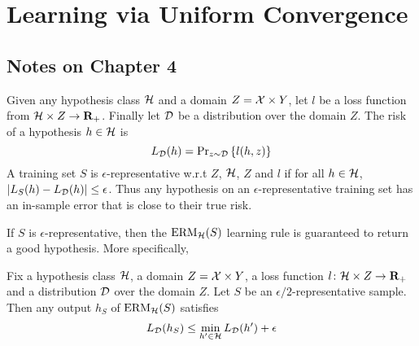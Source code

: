 \chapter{Learning via Uniform Convergence}

\section*{Notes on Chapter 4}

Given any hypothesis class $\mathcal{H}$ and a domain $Z = \mathcal{X} \times Y$, let
$l$ be a loss function from $\mathcal{H} \times Z \rightarrow \mathbf{R}_{+}$. Finally let
$\mathcal{D}$ be a distribution over the domain $Z$. The risk of a hypothesis $h \in
\mathcal{H}$ is
\[
    L_{\mathcal{D}}(h) = \text{Pr}_{z \sim \mathcal{D}} \left \{ l(h, z) \right \}
\]
A training set $S$ is $\epsilon$-representative w.r.t $Z$, $\mathcal{H}$, $Z$ and
$l$ if for all $h \in \mathcal{H}$, $|L_S (h) - L_{\mathcal{D}} (h)| \leq \epsilon$.
Thus any hypothesis on an $\epsilon$-representative training set has an
in-sample error that is close to their true risk. 

If $S$ is $\epsilon$-representative, then the $\operatorname{ERM}_{\mathcal{H}}(S)$ learning
rule is guaranteed to return a good hypothesis. More specifically,
\begin{lemma}
Fix a hypothesis class $\mathcal{H}$, a domain $Z = \mathcal{X} \times Y$, a loss 
function $l \colon \mathcal{H} \times Z \rightarrow \mathbf{R}_{+}$ and a distribution
$\mathcal{D}$ over the domain $Z$. Let $S$ be an $\epsilon/2$-representative sample. 
Then any output $h_S$ of $\operatorname{ERM}_{\mathcal{H}}(S)$ satisfies 
\[
    L_{\mathcal{D}} (h_S) \leq \min_{h' \in \mathcal{H}} L_{\mathcal{D}}(h') + \epsilon 
\]
\end{lemma}
